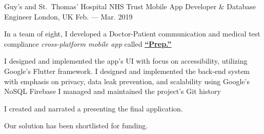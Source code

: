 \begin{cventries}
  \cventry
    {Guy's and St.\ Thomas’ Hospital NHS Trust} %
    {Mobile App Developer \& Database Engineer} %
    {London, UK} %
    {Feb. --- Mar. 2019} %
    {
      \begin{cvitems} %
        \item {In a team of eight, I developed a Doctor-Patient communication and medical test compliance \emph{cross-platform mobile app} called \href{https://dtetruash.github.io/prep-page/}{\textbf{\uline{``Prep.''}}}}
        \item I designed and implemented the app's UI with focus on accessibility, utilizing Google’s Flutter framework.
        \bsep{} {I designed and implemented the back-end system with emphasis on privacy, data leak prevention, and scalability using Google’s NoSQL Firebase}
        \bsep{} I managed and maintained the project's Git history
        \item {I created and narrated a \href{https://drive.google.com/file/d/1Pu6NSpqPXnWcaanUpIu_gd5C1bQnOyQi/preview}{} presenting the final application.}
        \item {Our solution has been shortlisted for funding.}
      \end{cvitems}
    }

\end{cventries}
